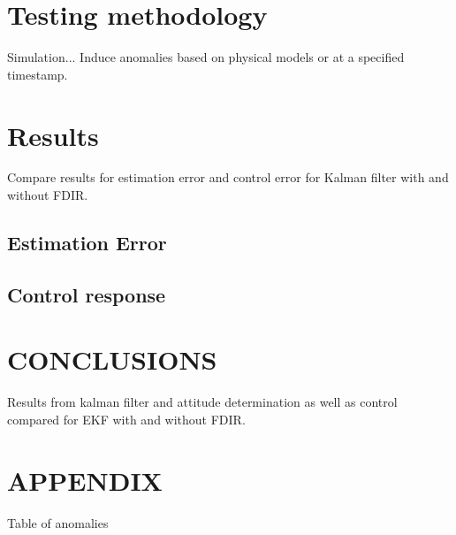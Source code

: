 \documentclass[letterpaper, 10 pt, conference]{ieeeconf}  %
\begin{document}
\section{Testing methodology}
Simulation... Induce anomalies based on physical models or at a specified timestamp.

\section{Results}
Compare results for estimation error and control error for Kalman filter with and without FDIR.

\subsection{Estimation Error}

\subsection{Control response}


\section{CONCLUSIONS}
Results from kalman filter and attitude determination as well as control compared for EKF with and without FDIR.

\addtolength{\textheight}{-12cm}   %







\section*{APPENDIX}
Table of anomalies
\end{document}
